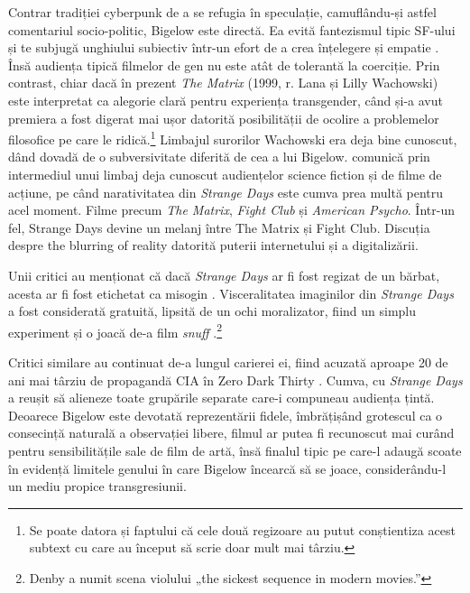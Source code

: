 \documentclass[12pt]{article}
\begin{document}
Contrar \dedouble tradiției\sqtworight\: cyberpunk de a se refugia în speculație, camuflându-și astfel comentariul socio-politic, Bigelow este directă. Ea evită fantezismul tipic SF-ului și te subjugă unghiului subiectiv într-un efort de a crea înțelegere și empatie \cite{Ebert1995a}. Însă audiența tipică filmelor de gen nu este atât de tolerantă la coerciție. Prin contrast, chiar dacă în prezent \textit{The Matrix} (1999, r. Lana și Lilly Wachowski) este interpretat ca alegorie clară pentru experiența transgender, când și-a avut premiera a fost digerat mai ușor datorită posibilității de ocolire a problemelor filosofice pe care le ridică.\footnote{Se poate datora și faptului că cele două regizoare au putut conștientiza acest subtext cu care au început să scrie doar mult mai târziu.} Limbajul surorilor Wachowski era deja bine cunoscut, dând dovadă de o subversivitate diferită de cea a lui Bigelow.  comunică prin intermediul unui limbaj deja cunoscut audiențelor science fiction și de filme de acțiune, pe când narativitatea din \textit{Strange Days} este cumva prea multă pentru acel moment. Filme precum \textit{The Matrix}, \textit{Fight Club} și \textit{American Psycho}. Într-un fel, Strange Days devine un melanj între The Matrix și Fight Club. Discuția despre the blurring of reality datorită puterii internetului și a digitalizării. \par 

Unii critici au menționat că dacă \textit{Strange Days} ar fi fost regizat de un bărbat, acesta ar fi fost etichetat ca misogin \cite{MirasolBigelowUncanny2010}. Visceralitatea imaginilor din \textit{Strange Days} a fost considerată gratuită, lipsită de un ochi moralizator, fiind un simplu experiment și o joacă de-a film \textit{snuff} \cite{Guthmann1995a, DenbyPeopleStrange1995}.\footnote{Denby a numit scena violului „the sickest sequence in modern movies.”}\par

Critici similare au continuat de-a lungul carierei ei, fiind acuzată aproape 20 de ani mai târziu de propagandă CIA în Zero Dark Thirty \cite{Vishnevetsky2012a}. Cumva, cu \textit{Strange Days} a reușit să alieneze toate grupările separate care-i compuneau audiența țintă. Deoarece Bigelow este devotată reprezentării fidele, îmbrățișând grotescul ca o consecință naturală a observației libere, filmul ar putea fi recunoscut mai curând pentru sensibilitățile sale de film de artă, însă finalul tipic pe care-l adaugă scoate în evidență limitele genului în care Bigelow încearcă să se joace, considerându-l un mediu propice transgresiunii.\par
\end{document}

